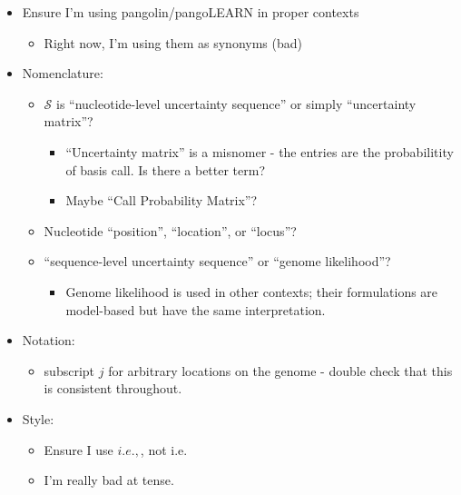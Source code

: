 \documentclass[
]{article}
\providecommand{\tightlist}{%
  \setlength{\itemsep}{0pt}\setlength{\parskip}{0pt}}
\newcommand{\ie}{\textit{i.e.},\xspace}
\newcommand{\nps}{\mathcal{S}} %
\begin{document}
\begin{itemize}
\tightlist
\item
  Ensure I'm using pangolin/pangoLEARN in proper contexts

  \begin{itemize}
  \tightlist
  \item
    Right now, I'm using them as synonyms (bad)
  \end{itemize}
\item
  Nomenclature:

  \begin{itemize}
  \tightlist
  \item
    \(\nps\) is ``nucleotide-level uncertainty sequence'' or simply
    ``uncertainty matrix''?

    \begin{itemize}
    \tightlist
    \item
      ``Uncertainty matrix'' is a misnomer - the entries are the
      probabilitity of basis call. Is there a better term?
    \item
      Maybe ``Call Probability Matrix''?
    \end{itemize}
  \item
    Nucleotide ``position'', ``location'', or ``locus''?
  \item
    ``sequence-level uncertainty sequence'' or ``genome likelihood''?

    \begin{itemize}
    \tightlist
    \item
      Genome likelihood is used in other contexts; their formulations
      are model-based but have the same interpretation.
    \end{itemize}
  \end{itemize}
\item
  Notation:

  \begin{itemize}
  \tightlist
  \item
    subscript \(j\) for arbitrary locations on the genome - double check
    that this is consistent throughout.
  \end{itemize}
\item
  Style:

  \begin{itemize}
  \tightlist
  \item
    Ensure I use \(\ie\), not i.e.
  \item
    I'm really bad at tense.
  \end{itemize}
\end{itemize}
\end{document}
